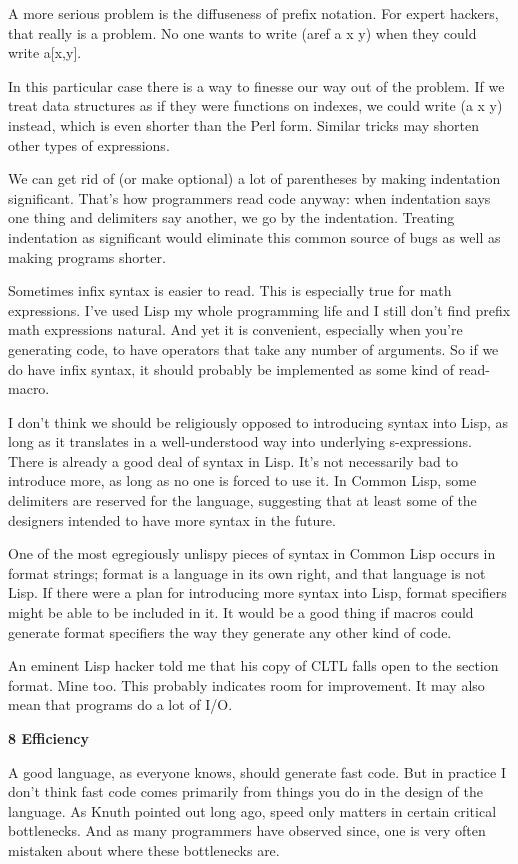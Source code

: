 A more serious problem is the diffuseness of prefix notation. For expert
hackers, that really is a problem. No one wants to write (aref a x y)
when they could write a{[}x,y{]}.

In this particular case there is a way to finesse our way out of the
problem. If we treat data structures as if they were functions on
indexes, we could write (a x y) instead, which is even shorter than the
Perl form. Similar tricks may shorten other types of expressions.

We can get rid of (or make optional) a lot of parentheses by making
indentation significant. That's how programmers read code anyway: when
indentation says one thing and delimiters say another, we go by the
indentation. Treating indentation as significant would eliminate this
common source of bugs as well as making programs shorter.

Sometimes infix syntax is easier to read. This is especially true for
math expressions. I've used Lisp my whole programming life and I still
don't find prefix math expressions natural. And yet it is convenient,
especially when you're generating code, to have operators that take any
number of arguments. So if we do have infix syntax, it should probably
be implemented as some kind of read-macro.

I don't think we should be religiously opposed to introducing syntax
into Lisp, as long as it translates in a well-understood way into
underlying s-expressions. There is already a good deal of syntax in
Lisp. It's not necessarily bad to introduce more, as long as no one is
forced to use it. In Common Lisp, some delimiters are reserved for the
language, suggesting that at least some of the designers intended to
have more syntax in the future.

One of the most egregiously unlispy pieces of syntax in Common Lisp
occurs in format strings; format is a language in its own right, and
that language is not Lisp. If there were a plan for introducing more
syntax into Lisp, format specifiers might be able to be included in it.
It would be a good thing if macros could generate format specifiers the
way they generate any other kind of code.

An eminent Lisp hacker told me that his copy of CLTL falls open to the
section format. Mine too. This probably indicates room for improvement.
It may also mean that programs do a lot of I/O.

\textbf{8 Efficiency}

A good language, as everyone knows, should generate fast code. But in
practice I don't think fast code comes primarily from things you do in
the design of the language. As Knuth pointed out long ago, speed only
matters in certain critical bottlenecks. And as many programmers have
observed since, one is very often mistaken about where these bottlenecks
are.

